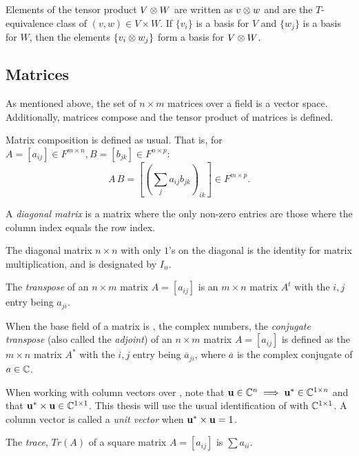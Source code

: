 Elements of the tensor product $V\otimes W$ are written as $v\otimes w$ and are the $T$-equivalence class of
$(v,w) \in V\times W$. If $\{v_i\}$ is a basis for $V$ and $\{w_j\}$ is a basis for $W$, then the
elements $\{v_i\otimes w_j\}$ form a basis for $V\otimes W$.
\subsection{Matrices} %
\label{sub:matrices}


As mentioned above, the set of $n\times m$ matrices over a field is a vector space. Additionally,
matrices compose and the tensor product of matrices is defined.

Matrix composition is defined as usual. That is, for $A = [a_{ij}] \in F^{m\times n}, B =
[b_{jk}]\in F^{n \times p}$:
  \[
    A \, B = \left[\left(\sum_{j}a_{ij}b_{jk}\right)_{ik}\right] \in F^{m \times p}.
  \]



\begin{definition}
  A \emph{diagonal matrix} is a matrix where the only non-zero entries are those where the column
  index equals the row index.
\end{definition}

The diagonal matrix $n\times n$ with only $1$'s on the diagonal is the identity for matrix
multiplication, and is designated by $I_n$.

\begin{definition}[Transpose]
  The \emph{transpose} of an $n\times m$ matrix $A=[a_{ij}]$ is an $m\times n$ matrix $A^{t}$ with
  the $i,j$ entry being $a_{ji}$.
\end{definition}

When the base field of a matrix is \complex, the complex numbers, the \emph{conjugate transpose}
(also called the \emph{adjoint}) of an $n\times m$ matrix $A=[a_{ij}]$ is defined as the $m\times
n$ matrix $A^{*}$ with the $i,j$ entry being $\overline{a}_{ji}$, where $\overline{a}$ is the
complex conjugate of $a\in\mathbb{C}$.

When working with column vectors over \complex, note that $\mathbf{u} \in \mathbb{C}^n \implies
\mathbf{u}^{*} \in \mathbb{C}^{1\times n}$ and that $\mathbf{u}^{*}\times \mathbf{u} \in \mathbb{C}^{1\times 1}$.
This thesis will use the usual identification of \complex{} with $\mathbb{C}^{1\times1}$. A column
vector  is called a \emph{unit vector} when $\mathbf{u}^{*}\times \mathbf{u} = 1$.

\begin{definition}[Trace]
  The \emph{trace}, $Tr(A)$ of a square matrix $A=[a_{ij}]$ is $\sum a_{ii}$.
\end{definition}

